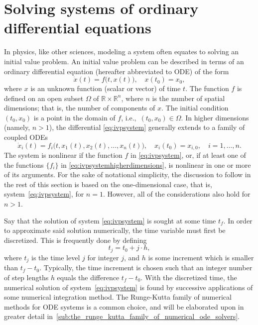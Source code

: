\section[Solving systems of ordinary differential equations]%
{Solving systems of ordinary differential eq\null{}uations}%
\label{sec:solving_systems_of_ordinary_differential_equations}

In physics, like other sciences, modeling a system often equates to solving an
initial value problem. An initial value problem can be described in terms of an
ordinary differential equation (hereafter abbreviated to ODE) of the form
\begin{equation}
    \label{eq:ivpsystem}
    \dot{x}(t) = f\big(t,x(t)\big), \quad x(t_{0}) = x_{0},
\end{equation}
where $x$ is an unknown function (scalar or vector) of time $t$. The function
$f$ is defined on an open subset $\Omega$ of $\mathbb{R}\times\mathbb{R}^{n}$,
where $n$ is the number of spatial dimensions; that is, the number of
components of $x$. The initial condition $(t_{0},x_{0})$ is a point in the
domain of $f$, i.e.,\ $(t_{0},x_{0})\in\Omega$. In higher dimensions (namely,
$n>1$), the differential \cref{eq:ivpsystem} generally extends to a family of
coupled ODEs
\begin{equation}
    \label{eq:ivpsystemhigherdimensions}
    \dot{x}_{i}(t) = f_{i}\big(t,x_{1}(t),x_{2}(t),\ldots,x_{n}(t)\big),%
    \quad x_{i}(t_{0}) = x_{i,0}, \quad i = 1,\ldots,n.
\end{equation}
The system is nonlinear if the function $f$ in \cref{eq:ivpsystem}, or, if at
least one of the functions $\{f_{i}\}$ in \cref{eq:ivpsystemhigherdimensions},
is nonlinear in one or more of its arguments. For the sake of notational
simplicity, the discussion to follow in the rest of this section is based
on the one-dimensional case, that is, system~\eqref{eq:ivpsystem}, for $n=1$.
However, all of the considerations also hold for $n>1$.

Say that the solution of system \eqref{eq:ivpsystem} is sought at some time
$t_{f}$. In order to approximate said solution numerically, the time variable
must first be discretized. This is frequently done by defining
\begin{equation}
    \label{eq:discretime}
    t_{j} = t_{0}+j\cdot{}h,
\end{equation}
where $t_{j}$ is the time level $j$ for integer $j$, and $h$ is some increment
which is smaller than $t_{f}-t_{0}$. Typically, the time increment is chosen
such that an integer number of step lengths $h$ equals the difference
$t_{f}-t_{0}$. With the discretized time, the numerical solution of
system~\eqref{eq:ivpsystem} is found by successive applications of some
numerical integration method. The Runge-Kutta family of numerical methods for
ODE systems is a common choice, and will be elaborated upon in greater detail
in~\cref{sub:the_runge_kutta_family_of_numerical_ode_solvers}.

